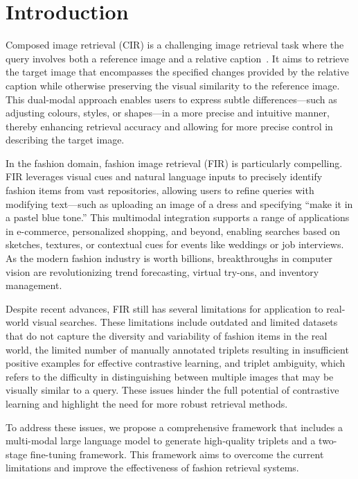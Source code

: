 \section{Introduction}

Composed image retrieval (CIR) is a challenging image retrieval task where the query involves both a reference image and a relative caption~\cite{liu2021,vo2019,baldrati2022}. It aims to retrieve the target image that encompasses the specified changes provided by the relative caption while otherwise preserving the visual similarity to the reference image. This dual-modal approach enables users to express subtle differences—such as adjusting colours, styles, or shapes—in a more precise and intuitive manner, thereby enhancing retrieval accuracy and allowing for more precise control in describing the target image.

In the fashion domain, fashion image retrieval (FIR) is particularly compelling. FIR leverages visual cues and natural language inputs to precisely identify fashion items from vast repositories, allowing users to refine queries with modifying text—such as uploading an image of a dress and specifying ``make it in a pastel blue tone.'' This multimodal integration supports a range of applications in e-commerce, personalized shopping, and beyond, enabling searches based on sketches, textures, or contextual cues for events like weddings or job interviews. As the modern fashion industry is worth billions, breakthroughs in computer vision are revolutionizing trend forecasting, virtual try-ons, and inventory management.

Despite recent advances, FIR still has several limitations for application to real-world visual searches. These limitations include outdated and limited datasets that do not capture the diversity and variability of fashion items in the real world, the limited number of manually annotated triplets resulting in insufficient positive examples for effective contrastive learning, and triplet ambiguity, which refers to the difficulty in distinguishing between multiple images that may be visually similar to a query. These issues hinder the full potential of contrastive learning and highlight the need for more robust retrieval methods.

To address these issues, we propose a comprehensive framework that includes a multi-modal large language model to generate high-quality triplets and a two-stage fine-tuning framework. This framework aims to overcome the current limitations and improve the effectiveness of fashion retrieval systems.


